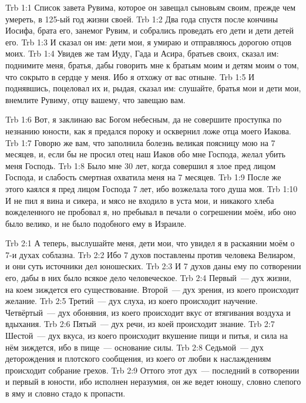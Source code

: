 \vs Trb 1:1
Список завета Рувима, которое он завещал сыновьям своим,
прежде чем умереть, в 125-ый год жизни своей.
\vs Trb 1:2
Два года спустя после кончины Иосифа, брата его, занемог Рувим,
и собрались проведать его дети и дети детей его.
\vs Trb 1:3
И сказал он им: дети мои, я умираю и отправляюсь дорогою отцов моих.
\vs Trb 1:4
Увидев же там Иуду, Гада и Асира,
братьев своих, сказал им:
поднимите меня, братья, дабы говорить мне к братьям моим
и детям моим о том, что сокрыто в сердце у меня.
Ибо я отхожу от вас отныне.
\vs Trb 1:5
И поднявшись, поцеловал их и, рыдая, сказал им:
слушайте, братья мои и дети мои, внемлите Рувиму,
отцу вашему, что завещаю вам.

\vs Trb 1:6
Вот, я заклинаю вас Богом небесным, да не совершите проступка
по незнанию юности, как я предался пороку и осквернил
ложе отца моего Иакова.
\vs Trb 1:7
Говорю же вам, что заполнила болезнь великая
поясницу мою на 7 месяцев, и, если бы не просил отец
наш Иаков обо мне Господа, желал убить меня Господь.
\vs Trb 1:8
Было мне 30 лет, когда совершил я злое пред лицом Господа,
и слабость смертная охватила меня на 7 месяцев.
\vs Trb 1:9
После же этого каялся я пред лицом Господа 7 лет,
ибо возжелала того душа моя.
\vs Trb 1:10
И не пил я вина и сикера, и мясо не входило в уста мои,
и никакого хлеба вожделенного не пробовал я,
но пребывал в печали о согрешении моём, ибо оно было велико,
и не было подобного ему в Израиле.

\vs Trb 2:1
А теперь, выслушайте меня, дети мои, что увидел я в раскаянии моём о
7-и духах соблазна.
\vs Trb 2:2
Ибо 7 духов поставлены против человека Велиаром, и они суть источники дел юношеских.
\vs Trb 2:3
И  7 духов даны ему по сотворении его,
дабы в них было всякое дело человеческое.
\vs Trb 2:4
Первый~--- дух жизни, на коем зиждется его существование.
Второй~--- дух зрения, из коего происходит желание.
\vs Trb 2:5
Третий~--- дух слуха, из коего происходит научение.
Четвёртый~--- дух обоняния, из коего происходит вкус
от втягивания воздуха и вдыхания.
\vs Trb 2:6
Пятый~--- дух речи, из коей происходит знание.
\vs Trb 2:7
Шестой~--- дух вкуса, из коего происходит вкушение пищи и питья,
и сила на нём зиждется, ибо в пище~---  основание силы.
\vs Trb 2:8
Седьмой~--- дух деторождения и плотского сообщения,
из коего от любви к наслаждениям происходит собрание грехов.
\vs Trb 2:9
Оттого этот дух~--- последний в сотворении и первый в юности,
ибо исполнен неразумия, он же ведет юношу, словно слепого в яму
и словно стадо к пропасти.

